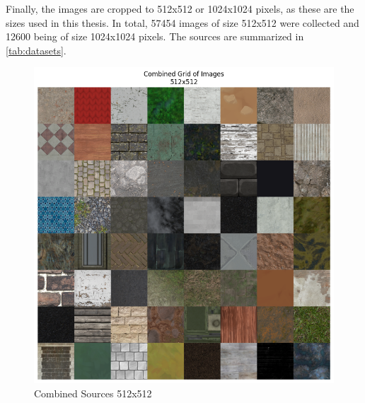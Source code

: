     Finally, the images are cropped to 512x512 or 1024x1024 pixels, as these are the sizes used in this thesis. In total, 57454 images of size 512x512 were collected and 12600 being of size 1024x1024 pixels. The sources are summarized in \autoref{tab:datasets}.


    \begin{figure}[h]
        \centering
        \begin{minipage}{.50\textwidth}
            \centering
            \includegraphics[width=\linewidth]{../code/dataAnalysis/plots/exampleImgs/DataCombined512x.png}
            \caption{Combined Sources 512x512}
            \label{fig:exmapleImgs512}
        \end{minipage}\hfill
        \begin{minipage}{.50\textwidth}
            \centering

\end{minipage}
\end{figure}
